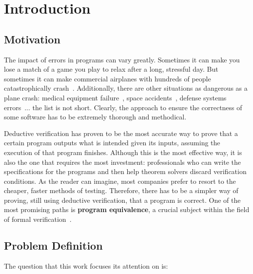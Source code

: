 
%

\chapter{Introduction}
\label{cha:introduction}

\section{Motivation} 

The impact of errors in programs can vary greatly.
Sometimes it can make you lose a match of a game you play to relax after a long, stressful day.
But sometimes it can make commercial airplanes with hundreds of people catastrophically crash~\cite{air-india}.
Additionally, there are other situations as dangerous as a plane crash: medical equipment failure~\cite{therac-25}, space accidents~\cite{ariane}, defense systems errors~\cite{patriot}... the list is not short.
Clearly, the approach to ensure the correctness of some software has to be extremely thorough and methodical.

Deductive verification has proven to be the most accurate way to prove that a certain program outputs what is intended given its inputs, assuming the execution of that program finishes.
Although this is the most effective way, it is also the one that requires the most investment: professionals who can write the specifications for the programs and then help theorem solvers discard verification conditions.
As the reader can imagine, most companies prefer to resort to the cheaper, faster methods of testing.
Therefore, there has to be a simpler way of proving, still using deductive verification, that a program is correct.
One of the most promising paths is \textbf{program equivalence}, a crucial subject within the field of formal verification~\cite{DBLP:journals/fmsd/Strichman18}.


\section{Problem Definition}

The question that this work focuses its attention on is:

